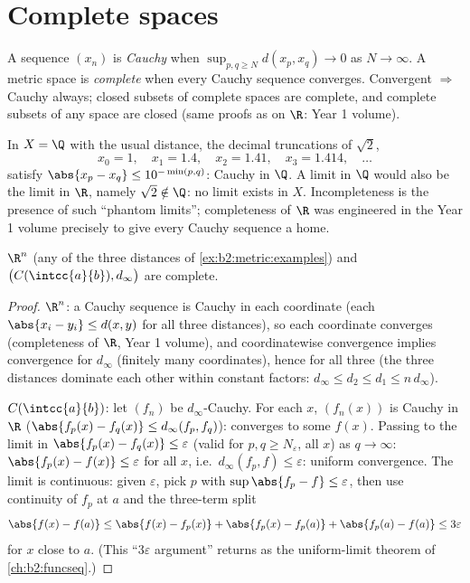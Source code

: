 \section{Complete spaces}

\begin{definition}\label{def:b2:metric:complete}
A sequence $(x_n)$ is \emph{Cauchy} when $\sup_{p, q \geq N} d(x_p,
x_q) \to 0$ as $N \to \infty$. A metric space is
\emph{complete} when every Cauchy
sequence converges. Convergent $\Rightarrow$ Cauchy always; closed
subsets of complete spaces are complete, and complete subsets of any
space are closed (same proofs as on $\R$: Year 1 volume).
\end{definition}

\begin{example}\label{ex:b2:metric:cauchynolimit}
In $X = \Q$ with the usual distance, the decimal truncations of
$\sqrt2$,
\[
x_0 = 1,\quad x_1 = 1.4,\quad x_2 = 1.41,\quad x_3 = 1.414,
\quad\dots
\]
satisfy $\abs{x_p - x_q} \leq 10^{-\min(p,q)}$: Cauchy in $\Q$.
A limit in $\Q$ would also be the limit in $\R$, namely
$\sqrt2 \notin \Q$: no limit exists in $X$. Incompleteness is
the presence of such ``phantom limits''; completeness of $\R$
was engineered in the Year 1 volume precisely to give every
Cauchy sequence a home.
\end{example}

\begin{theorem}\label{thm:b2:metric:rncomplete}
$\R^n$ (any of the three distances of
\cref{ex:b2:metric:examples}) and $\bigl(C(\intcc{a}{b}),
d_\infty\bigr)$ are complete.
\end{theorem}

\begin{proof}
$\R^n$: a Cauchy sequence is Cauchy in each coordinate (each
$\abs{x_i - y_i} \leq d(x,y)$ for all three distances), so each
coordinate converges (completeness of $\R$, Year 1 volume), and
coordinatewise convergence implies convergence for $d_\infty$
(finitely many coordinates), hence for all three (the three
distances dominate each other within constant factors: $d_\infty
\leq d_2 \leq d_1 \leq n\,d_\infty$).

$C(\intcc{a}{b})$: let $(f_n)$ be $d_\infty$-Cauchy. For each $x$,
$(f_n(x))$ is Cauchy in $\R$ ($\abs{f_p(x) - f_q(x)} \leq
d_\infty(f_p, f_q)$): converges to some $f(x)$. Passing to the
limit in $\abs{f_p(x) - f_q(x)} \leq \varepsilon$ (valid for $p, q
\geq N_\varepsilon$, all $x$) as $q \to \infty$: $\abs{f_p(x) -
f(x)} \leq \varepsilon$ for all $x$, i.e.\ $d_\infty(f_p, f) \leq
\varepsilon$: uniform convergence. The limit is continuous: given
$\varepsilon$, pick $p$ with $\sup\abs{f_p - f} \leq \varepsilon$,
then use continuity of $f_p$ at $a$ and the three-term split
\[
\abs{f(x) - f(a)} \leq \abs{f(x) - f_p(x)} + \abs{f_p(x) - f_p(a)}
+ \abs{f_p(a) - f(a)} \leq 3\varepsilon
\]
for $x$ close to $a$. (This ``$3\varepsilon$ argument'' returns as
the uniform-limit theorem of \cref{ch:b2:funcseq}.)
\end{proof}

